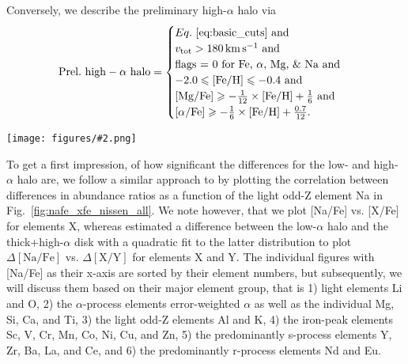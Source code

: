 \documentclass[fleqn,usenatbib]{mnras}
\newcommand{\codeicon}{{\faCloudDownload}}
\newcommand{\codelink}[1]{\href{https://github.com/svenbuder/buder_galah_accreted_chemistry/tree/main/figures/#1.ipynb}{\codeicon}\,\,}
\newcommand{\oscaption}[2]{\caption{#2 \codelink{#1}}}
\newcommand{\figuretextwidth}[4]{\begin{figure*} \centering \texttt{[image: figures/\#2.png]}\oscaption{#3}{#4}\label{fig:#2} \end{figure*}}
\begin{document}
Conversely, we describe the preliminary high-$\alpha$ halo via
\begin{equation} \label{eq:prelim_high_alpha_halo}
\mathrm{Prel.~high-\alpha~halo} =
\begin{cases}
Eq.~\ref{eq:basic_cuts} \text{ and} \\
v_\text{tot} > 180\,\mathrm{km\,s^{-1}} \text{ and} \\
\text{flags = 0 for Fe, }\alpha\text{, Mg, \& Na and} \\
-2.0 \leq \mathrm{[Fe/H]} \leq -0.4 \text{ and}\\
\mathrm{[Mg/Fe]} \geq - \frac{1}{12} \times \mathrm{[Fe/H]} + \frac{1}{6} \text{ and}\\
\mathrm{[\alpha/Fe]} \geq - \frac{1}{6} \times \mathrm{[Fe/H]} + \frac{0.7}{12}.\\
\end{cases}
\end{equation}

\figuretextwidth{17cm}{nafe_xfe_nissen_all}{chemical_differences}{
\textbf{Abundances [X/Fe] for the the 28 elements measured by GALAH in addition to Na and Fe, whose abundance ratio [Na/Fe] is used on the ordinate.} The density distribution of the base sample of GALAH+ DR3 (Eq.~\ref{eq:basic_cuts}) is shown in greyscale. GALAH+ DR3 stars which are preliminary tagged to the low-$\alpha$ halo (via Eq.~\ref{eq:prelim_low_alpha_halo}) are shown in orange.
We also overplot the data by \citet{Nissen2010} for $\alpha$, Na, Mg, Si, Ca, Ti, Cr, and Ni with red circles for their low-$\alpha$ halo stars, blue open circles for their high-$\alpha$ halo stars and black crossed for their thick disk stars. For the same stars of this study, we plot the data by \citet{Nissen2011} for Mn, Cu, Zn, Y, and Ba, \citet{Nissen2012} for Li (their non-LTE values), \citet{Nissen2014} for O (their non-LTE values based on the $\lambda 7774$ \ion{O}{i} triplet), and \citet{Fishlock2017} for Sc, Zr, La, Ce, Nd, and Eu. Arrows show upper limits coloured by their respective selection.
}

To get a first impression, of how significant the differences for the low- and high-$\alpha$ halo are, we follow a similar approach to \citet[][see their Fig.~5]{Nissen2011} by plotting the correlation between differences in abundance ratios as a function of the light odd-Z element Na in Fig.~\ref{fig:nafe_xfe_nissen_all}. We note however, that we plot [Na/Fe] vs. [X/Fe] for elements X, whereas \citet{Nissen2011} estimated a difference between the low-$\alpha$ halo and the thick+high-$\alpha$ disk with a quadratic fit to the latter distribution to plot $\Delta \mathrm{[Na/Fe]}$ vs. $\Delta \mathrm{[X/Y]}$ for elements X and Y. The individual figures with [Na/Fe] as their x-axis are sorted by their element numbers, but subsequently, we will discuss them based on their major element group, that is 1) light elements Li and O, 2) the $\alpha$-process elements error-weighted $\alpha$ as well as the individual Mg, Si, Ca, and Ti, 3) the light odd-Z elements Al and K, 4) the iron-peak elements Sc, V, Cr, Mn, Co, Ni, Cu, and Zn, 5) the predominantly s-process elements Y, Zr, Ba, La, and Ce, and 6) the predominantly r-process elements Nd and Eu.
\end{document}
